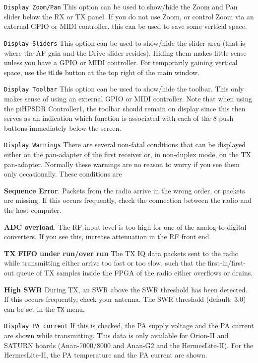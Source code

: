 \documentclass[12pt]{book}
\def\rett#1{\texttt{\color{red}#1}}
\def\bltt#1{\texttt{\color{blue}#1}}
\def\pH{pi\-HPSDR }
\begin{document}
 \rett{Display Zoom/Pan} This option can be used to show/hide the Zoom and
 Pan slider below the RX or TX panel. If you do not use Zoom, or control
 Zoom via an external GPIO or MIDI controller, this can be used to save
 some vertical space.

 \rett{Display Sliders} This option can be used to show/hide the slider area
 (that is where the AF gain and the Drive slider resides).
 Hiding them makes little sense unless you
 have a GPIO or MIDI controller. For temporarily gaining vertical space,
 use the \rett{Hide} button at the top right of the main window.

 \rett{Display Toolbar} This option can be used to show/hide the toolbar. This
 only makes sense of using an external GPIO or MIDI controller. Note that
 when using the \pH Controller1, the toolbar should remain on display since
 this then serves as an indication which function is associated with each of
 the 8 push buttons immediately below the screen.

\rett{Display Warnings} There are several non-fatal conditions that can
be displayed either on the pan-adapter of the first receiver or, in non-duplex
mode, on the TX pan-adapter. Normally these warnings are no reason to worry
if you see them  only occasionally. These conditions are

\textbf{Sequence Error}. Packets from the radio arrive in the wrong order, or packets
are missing. If this occurs frequently, check the connection between the radio and
the host computer.

\textbf{ADC overload}. The RF input level is too high for one of the analog-to-digital
converters. If you see this, increase attenuation in the RF front end.

\textbf{TX FIFO under run/over run} The TX IQ data packets sent to the radio while transmitting
either arrive too fast or too slow, such that the first-in/first-out queue of TX samples
inside the FPGA of the radio either overflows or drains.

\textbf{High SWR} During TX, an SWR above the SWR threshold has been detected. If this occurs
frequently, check your antenna. The SWR threshold (default: 3.0) can be set in the
\bltt{TX} menu.

\rett{Display PA current} If this is checked, the PA supply voltage and the PA current
are shown while transmitting. This data is only available for Orion-II and SATURN boards
(Anan-7000/8000 and Anan-G2 and the HermesLite-II).
 For the HermesLite-II, the PA temperature and the PA current are shown.
\end{document}

